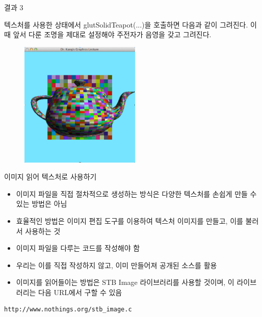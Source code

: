 \documentclass{beamer}
\begin{document}
\begin{frame}[fragile]{결과 3}

텍스처를 사용한 상태에서 {\sf glutSolidTeapot(...)}을 호출하면 다음과 같이 그려진다. 이때 앞서 다룬 조명을 제대로 설정해야 주전자가 음영을 갖고 그려진다.

\begin{figure}[h!]
  \centering
	\includegraphics[height=6cm]{OGL_texture/texMap3.png}
\end{figure}


\end{frame}


\begin{frame}[fragile]{이미지 읽어 텍스처로 사용하기}

\begin{itemize}
\item 이미지 파일을 직접 절차적으로 생성하는 방식은 다양한 텍스처를 손쉽게 만들 수 있는 방법은 아님
\item 효율적인 방법은 이미지 편집 도구를 이용하여 텍스처 이미지를 만들고, 이를 불러서 사용하는 것
\item 이미지 파일을 다루는 코드를 작성해야 함
\item 우리는 이를 직접 작성하지 않고, 이미 만들어져 공개된 소스를 활용
\item 이미지를 읽어들이는 방법은 STB Image 라이브러리를 사용할 것이며, 이 라이브러리는 다음 URL에서 구할 수 있음
\end{itemize}

\begin{verbatim}
http://www.nothings.org/stb_image.c
\end{verbatim}

\end{frame}
\end{document}

